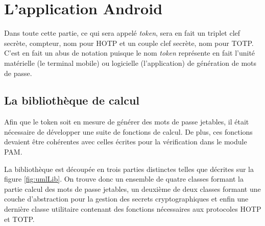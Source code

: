\newpage
\section{L'application Android}
Dans toute cette partie, ce qui sera appelé \emph{token}, sera en fait un triplet clef secrète,
compteur, nom pour HOTP et un couple clef secrète, nom pour TOTP. C'est en fait un abus de notation
puisque le nom \emph{token} représente en fait l'unité matérielle (le terminal mobile) ou logicielle
(l'application) de génération de mots de passe.

\subsection{La bibliothèque de calcul}
Afin que le token soit en mesure de générer des mots de passe jetables, il était
nécessaire de développer une suite de fonctions de calcul. De plus, ces fonctions devaient
être cohérentes avec celles écrites pour la vérification dans le module PAM.

La bibliothèque est découpée en trois parties distinctes telles que décrites sur la figure
\ref{fig:umlLib}. On trouve donc un ensemble de quatre classes formant la partie calcul
des mots de passe jetables, un deuxième de deux classes formant une couche d'abstraction
pour la gestion des secrets cryptographiques et enfin une dernière classe utilitaire
contenant des fonctions nécessaires aux protocoles HOTP et TOTP.

